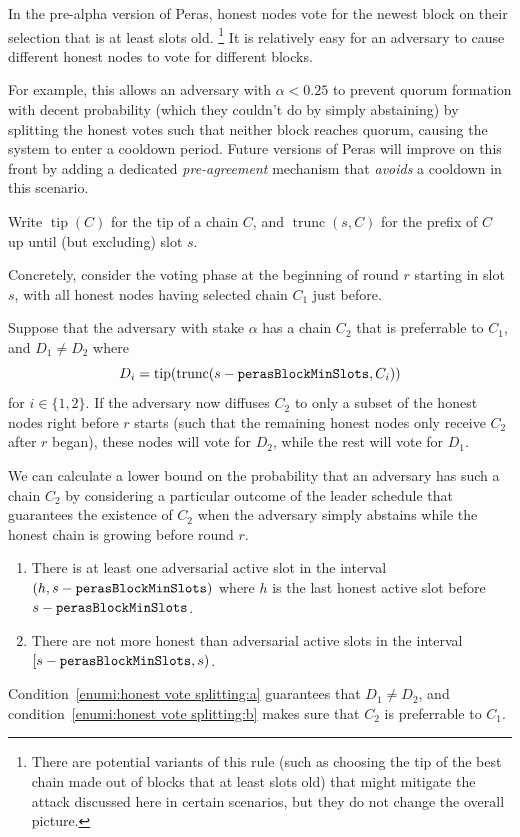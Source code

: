 In the pre-alpha version of Peras, honest nodes vote for the newest block on their selection that is at least \perasBlockMinSlots{} slots old.%
\footnote{There are potential variants of this rule (such as choosing the tip of the best chain made out of blocks that at least \perasBlockMinSlots{} slots old) that might mitigate the attack discussed here in certain scenarios, but they do not change the overall picture.}
It is relatively easy for an adversary to cause different honest nodes to vote for different blocks.

For example, this allows an adversary with $\alpha<0.25$ to prevent quorum formation with decent probability (which they couldn't do by simply abstaining) by splitting the honest votes such that neither block reaches quorum, causing the system to enter a cooldown period.
Future versions of Peras will improve on this front by adding a dedicated \emph{pre-agreement} mechanism that \emph{avoids} a cooldown in this scenario.

Write $\operatorname{tip}(C)$ for the tip of a chain $C$, and $\operatorname{trunc}(s,C)$ for the prefix of $C$ up until (but excluding) slot $s$.

Concretely, consider the voting phase at the beginning of round $r$ starting in slot $s$, with all honest nodes having selected chain $C_1$ just before.

Suppose that the adversary with stake $\alpha$ has a chain $C_2$ that is preferrable to $C_1$, and $D_1 \neq D_2$ where \[D_i = \operatorname{tip}(\operatorname{trunc}(s-\mathtt{perasBlockMinSlots},C_i))\] for $i\in\{1,2\}$.
If the adversary now diffuses $C_2$ to only a subset of the honest nodes right before $r$ starts (such that the remaining honest nodes only receive $C_2$ after $r$ began), these nodes will vote for $D_2$, while the rest will vote for $D_1$.

We can calculate a lower bound on the probability that an adversary has such a chain $C_2$ by considering a particular outcome of the leader schedule that guarantees the existence of $C_2$ when the adversary simply abstains while the honest chain is growing before round $r$.

\begin{enumerate}
\item\label{enumi:honest vote splitting:a}
  There is at least one adversarial active slot in the interval $(h,s-\mathtt{perasBlockMinSlots})$ where $h$ is the last honest active slot before $s-\mathtt{perasBlockMinSlots}$.
\item\label{enumi:honest vote splitting:b}
  There are not more honest than adversarial active slots in the interval $[s-\mathtt{perasBlockMinSlots}, s)$.
\end{enumerate}
Condition~\ref{enumi:honest vote splitting:a} guarantees that $D_1\neq D_2$, and condition~\ref{enumi:honest vote splitting:b} makes sure that $C_2$ is preferrable to $C_1$.

